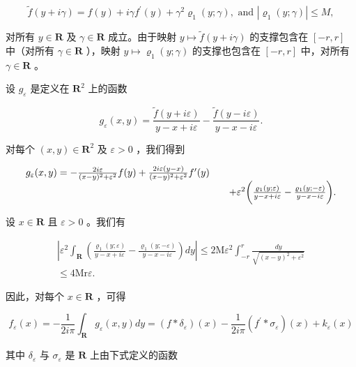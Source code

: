 \[
\widetilde {f} (y + i \gamma) = f (y) + i \gamma f ^ {\prime} (y) + \gamma^ {2} \varrho_ {1} (y; \gamma), \text {   and   } | \varrho_ {1} (y; \gamma) | \leqslant M,
\]

对所有 \(y \in \mathbf{R}\) 及 \(\gamma \in \mathbf{R}\) 成立。由于映射 \(y \mapsto \widetilde{f}(y + i\gamma)\) 的支撑包含在 \([-r, r]\) 中（对所有 \(\gamma \in \mathbf{R}\) ），映射 \(y \mapsto \varrho_{1}(y; \gamma)\) 的支撑也包含在 \([-r, r]\) 中，对所有 \(\gamma \in \mathbf{R}\) 。

设 \(g_{\varepsilon}\) 是定义在 \(\mathbf{R}^2\) 上的函数

\[
g _ {\varepsilon} (x, y) = \frac {\widetilde {f} (y + i \varepsilon)}{y - x + i \varepsilon} - \frac {\widetilde {f} (y - i \varepsilon)}{y - x - i \varepsilon}.
\]

对每个 \((x,y)\in \mathbf{R}^2\) 及 \(\varepsilon >0\) ，我们得到

\[
\begin{array}{r l} g _ {\varepsilon} (x, y) = - \frac {2 i \varepsilon}{(x - y) ^ {2} + \varepsilon^ {2}} f (y) + \frac {2 i \varepsilon (y - x)}{(x - y) ^ {2} + \varepsilon^ {2}} f ^ {\prime} (y) \\ & \quad + \varepsilon^ {2} \bigg (\frac {\varrho_ {1} (y ; \varepsilon)}{y - x + i \varepsilon} - \frac {\varrho_ {1} (y ; - \varepsilon)}{y - x - i \varepsilon} \bigg). \end{array}
\]

设 \(x \in \mathbf{R}\) 且 \(\varepsilon > 0\) 。我们有

\[
\begin{array}{c} \left| \varepsilon^ {2} \int_ {\mathbf {R}} \left(\frac {\varrho_ {1} (y ; \varepsilon)}{y - x + i \varepsilon} - \frac {\varrho_ {1} (y ; - \varepsilon)}{y - x - i \varepsilon}\right) d y \right| \leqslant 2 \mathrm{M} \varepsilon^ {2} \int_ {- r} ^ {r} \frac {d y}{\sqrt {(x - y) ^ {2} + \varepsilon^ {2}}} \\ \leqslant 4 \mathrm{Mr} \varepsilon . \end{array}
\]

因此，对每个 \(x \in \mathbf{R}\) ，可得

\[
f _ {\varepsilon} (x) = - \frac {1}{2 i \pi} \int_ {\mathbf {R}} g _ {\varepsilon} (x, y) d y = (f * \delta_ {\varepsilon}) (x) - \frac {1}{2 i \pi} (f ^ {\prime} * \sigma_ {\varepsilon}) (x) + k _ {\varepsilon} (x)
\]

其中 \(\delta_{\varepsilon}\) 与 \(\sigma_{\varepsilon}\) 是 \(\mathbf{R}\) 上由下式定义的函数

